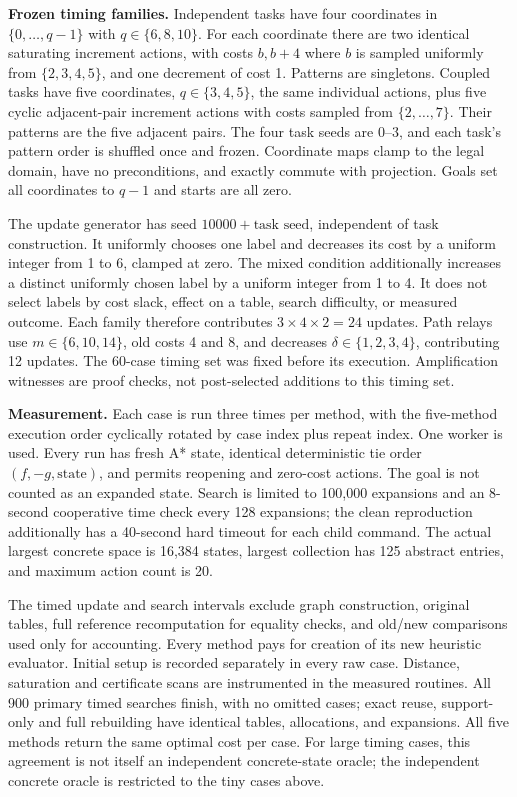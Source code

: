 \textbf{Frozen timing families.} Independent tasks have four coordinates in $\{0,\ldots,q-1\}$ with $q\in\{6,8,10\}$. For each coordinate there are two identical saturating increment actions, with costs $b,b+4$ where $b$ is sampled uniformly from $\{2,3,4,5\}$, and one decrement of cost 1. Patterns are singletons. Coupled tasks have five coordinates, $q\in\{3,4,5\}$, the same individual actions, plus five cyclic adjacent-pair increment actions with costs sampled from $\{2,\ldots,7\}$. Their patterns are the five adjacent pairs. The four task seeds are 0--3, and each task's pattern order is shuffled once and frozen. Coordinate maps clamp to the legal domain, have no preconditions, and exactly commute with projection. Goals set all coordinates to $q-1$ and starts are all zero.

The update generator has seed $10000+\text{task seed}$, independent of task construction. It uniformly chooses one label and decreases its cost by a uniform integer from 1 to 6, clamped at zero. The mixed condition additionally increases a distinct uniformly chosen label by a uniform integer from 1 to 4. It does not select labels by cost slack, effect on a table, search difficulty, or measured outcome. Each family therefore contributes $3\times4\times2=24$ updates. Path relays use $m\in\{6,10,14\}$, old costs 4 and 8, and decreases $\delta\in\{1,2,3,4\}$, contributing 12 updates. The 60-case timing set was fixed before its execution. Amplification witnesses are proof checks, not post-selected additions to this timing set.

\textbf{Measurement.} Each case is run three times per method, with the five-method execution order cyclically rotated by case index plus repeat index. One worker is used. Every run has fresh A* state, identical deterministic tie order $(f,-g,\text{state})$, and permits reopening and zero-cost actions. The goal is not counted as an expanded state. Search is limited to 100,000 expansions and an 8-second cooperative time check every 128 expansions; the clean reproduction additionally has a 40-second hard timeout for each child command. The actual largest concrete space is 16,384 states, largest collection has 125 abstract entries, and maximum action count is 20.

The timed update and search intervals exclude graph construction, original tables, full reference recomputation for equality checks, and old/new comparisons used only for accounting. Every method pays for creation of its new heuristic evaluator. Initial setup is recorded separately in every raw case. Distance, saturation and certificate scans are instrumented in the measured routines. All 900 primary timed searches finish, with no omitted cases; exact reuse, support-only and full rebuilding have identical tables, allocations, and expansions. All five methods return the same optimal cost per case. For large timing cases, this agreement is not itself an independent concrete-state oracle; the independent concrete oracle is restricted to the tiny cases above.

